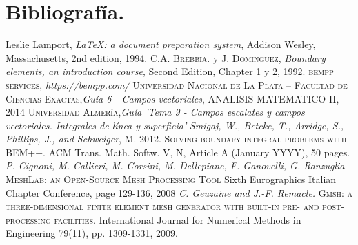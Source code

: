 \documentclass[11pt]{article}
\begin{document}
\begin{tcolorbox}

\end{tcolorbox}


\begin{tcolorbox}

\end{tcolorbox}

\begin{tcolorbox}

\end{tcolorbox}


\begin{tcolorbox}

\end{tcolorbox}


\begin{tcolorbox}

\end{tcolorbox}


\begin{tcolorbox}

\end{tcolorbox}


\begin{tcolorbox}

\end{tcolorbox}
\newpage
\section{Bibliografía.}
\begin{thebibliography}{9}
  Leslie Lamport,
  \textit{\LaTeX: a document preparation system},
  Addison Wesley, Massachusetts,
  2nd edition,
  1994.
 \textsc{C.A. Brebbia.} y \textsc{J. Dominguez},\textit{ Boundary elements, an introduction course}, Second Edition, Chapter 1 y 2, 1992.
 \textsc{bempp services},\textit{ https://bempp.com/}
 \textsc{Universidad Nacional de La Plata – Facultad de Ciencias Exactas},\textit{Guía 6 - Campos vectoriales}, ANALISIS MATEMATICO II, 2014
 \textsc{Universidad Almería},\textit{Guía 'Tema 9 - Campos escalates y campos vectoriales. Integrales de línea y superficia'}
\textit{Smigaj, W., Betcke, T., Arridge, S., Phillips, J., and Schweiger}, M. 2012. \textsc{Solving boundary integral problems
with BEM++.} ACM Trans. Math. Softw. V, N, Article A (January YYYY), 50 pages.
 \textit{P. Cignoni, M. Callieri, M. Corsini, M. Dellepiane, F. Ganovelli, G. Ranzuglia} \textsc{MeshLab: an Open-Source Mesh Processing Tool} Sixth Eurographics Italian Chapter Conference, page 129-136, 2008
 \textit{C. Geuzaine and J.-F. Remacle.} \textsc{Gmsh: a three-dimensional finite element mesh generator with built-in pre- and post-processing facilities.} International Journal for Numerical Methods in Engineering 79(11), pp. 1309-1331, 2009.

\end{thebibliography}
\end{document}
